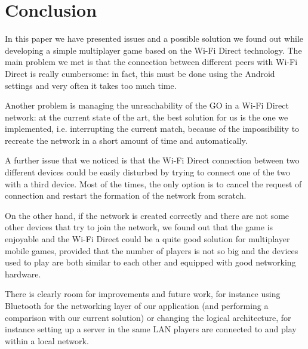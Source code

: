 \section{Conclusion}
In this paper we have presented issues and a possible solution we
found out while developing a simple multiplayer game based on the Wi-Fi Direct
technology. The main problem we met is that the connection between
different peers with Wi-Fi Direct is really cumbersome: in fact, this must be
done using the Android settings and very often it takes too much time.

Another problem is managing the unreachability of the GO in a Wi-Fi Direct
network: at the current state of the art, the best solution for us is the one
we implemented, i.e. interrupting the current match, because of the
impossibility to recreate the network in a short amount of time and
automatically.

A further issue that we noticed is that the Wi-Fi Direct connection
between two different devices could be easily disturbed by trying to connect
one of the two with a third device. Most of the times, the only option is to
cancel the request of connection and restart the formation of the network from
scratch.

On the other hand, if the network is created correctly and there are not
some other devices that try to join the network, we found out that the game
is enjoyable and the Wi-Fi Direct could be a quite good solution for
multiplayer mobile games, provided that the number of players is not so big and
the devices used to play are both similar to each other and equipped with good
networking hardware.

There is clearly room for improvements and future work, for instance
using Bluetooth for the networking layer of our application (and performing a
comparison with our current solution) or changing the logical architecture, for
instance setting up a server in the same LAN players are connected to and
play within a local network.
